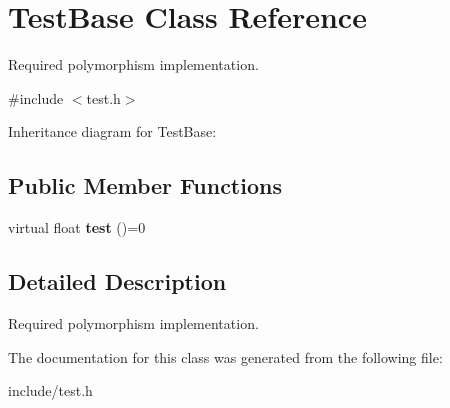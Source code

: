 \hypertarget{classTestBase}{}\section{Test\+Base Class Reference}
\label{classTestBase}


Required polymorphism implementation.  




{\ttfamily \#include $<$test.\+h$>$}



Inheritance diagram for Test\+Base\+:
\subsection*{Public Member Functions}
\begin{DoxyCompactItemize}
\item 
\mbox{\label{classTestBase_a56ede51bc088861f81b301fed7aab942}} 
virtual float {\bfseries test} ()=0
\end{DoxyCompactItemize}


\subsection{Detailed Description}
Required polymorphism implementation. 

The documentation for this class was generated from the following file\+:\begin{DoxyCompactItemize}
\item 
include/test.\+h\end{DoxyCompactItemize}
